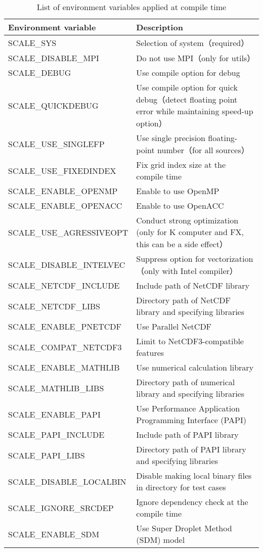 \begin{table}[htb]
\begin{center}
\caption{List of environment variables applied at compile time}
\begin{tabularx}{150mm}{|l|X|} \hline
 \rowcolor[gray]{0.9} Environment variable & Description \\ \hline
 SCALE\_SYS               & Selection of system（required）\\ \hline
 SCALE\_DISABLE\_MPI      & Do not use MPI（only for utils）\\ \hline
 SCALE\_DEBUG             & Use compile option for debug \\ \hline
 SCALE\_QUICKDEBUG        & Use compile option for quick debug（detect floating point error while maintaining speed-up option）\\ \hline
 SCALE\_USE\_SINGLEFP     & Use single precision floating-point number（for all sources）\\ \hline
 SCALE\_USE\_FIXEDINDEX   & Fix grid index size at the compile time \\ \hline
 SCALE\_ENABLE\_OPENMP    & Enable to use OpenMP \\ \hline
 SCALE\_ENABLE\_OPENACC   & Enable to use OpenACC \\ \hline
 SCALE\_USE\_AGRESSIVEOPT & Conduct strong optimization (only for K computer and FX, this can be a side effect）\\ \hline
 SCALE\_DISABLE\_INTELVEC & Suppress option for vectorization（only with Intel compiler）\\ \hline
 SCALE\_NETCDF\_INCLUDE   & Include path of NetCDF library \\ \hline
 SCALE\_NETCDF\_LIBS      & Directory path of NetCDF library and specifying libraries \\ \hline
 SCALE\_ENABLE\_PNETCDF   & Use Parallel NetCDF \\ \hline
 SCALE\_COMPAT\_NETCDF3   & Limit to NetCDF3-compatible features \\ \hline
 SCALE\_ENABLE\_MATHLIB   & Use numerical calculation library \\ \hline
 SCALE\_MATHLIB\_LIBS     & Directory path of numerical library and specifying libraries \\ \hline
 SCALE\_ENABLE\_PAPI      & Use Performance Application Programming Interface (PAPI) \\ \hline
 SCALE\_PAPI\_INCLUDE     & Include path of PAPI library \\ \hline
 SCALE\_PAPI\_LIBS        & Directory path of PAPI library and specifying libraries \\ \hline
 SCALE\_DISABLE\_LOCALBIN & Disable making local binary files in directory for test cases \\ \hline
 SCALE\_IGNORE\_SRCDEP    & Ignore dependency check at the compile time \\ \hline
 SCALE\_ENABLE\_SDM       & Use Super Droplet Method (SDM) model \\ \hline
\end{tabularx}
\label{tab:env_var_list}
\end{center}
\end{table}



